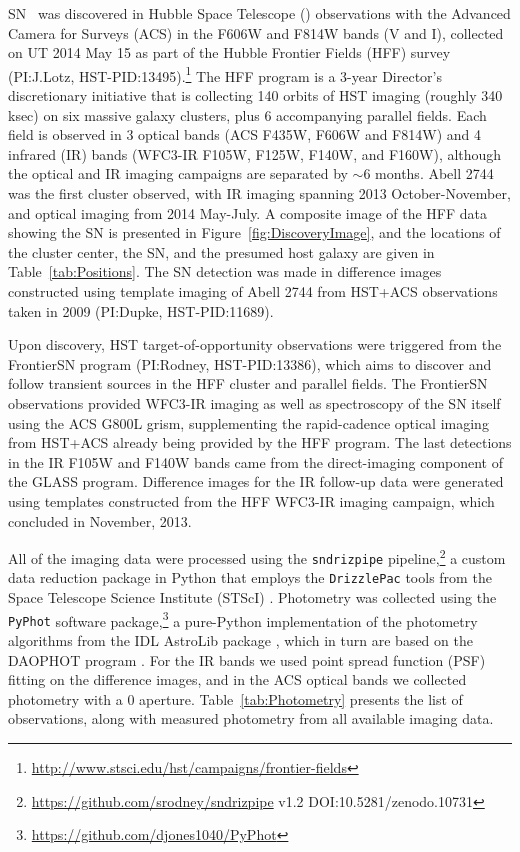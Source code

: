 SN \tomas\ was discovered in Hubble Space Telescope (\HST) observations
with the Advanced Camera for Surveys (ACS) in the F606W and F814W
bands (V and I), collected on UT 2014 May 15 as part of the Hubble
Frontier Fields (HFF) survey (PI:J.Lotz,
HST-PID:13495).\footnote{\url{http://www.stsci.edu/hst/campaigns/frontier-fields}}
The HFF program is a 3-year Director's discretionary initiative that
is collecting 140 orbits of HST imaging (roughly 340 ksec) on six
massive galaxy clusters, plus 6 accompanying parallel fields.  Each
field is observed in 3 optical bands (ACS F435W, F606W and F814W) and
4 infrared (IR) bands (WFC3-IR F105W, F125W, F140W, and F160W),
although the optical and IR imaging campaigns are separated by $\sim$6
months. Abell 2744 was the first cluster observed, with IR imaging
spanning 2013 October-November, and optical imaging from 2014
May-July.  A composite image of the HFF data showing the SN is
presented in Figure~\ref{fig:DiscoveryImage}, and the
locations of the cluster center, the SN, and the presumed host galaxy
are given in Table~\ref{tab:Positions}.  The SN detection was made in
difference images constructed using template imaging of Abell 2744
from HST+ACS observations taken in 2009 (PI:Dupke, HST-PID:11689).





Upon discovery, HST target-of-opportunity observations were triggered
from the FrontierSN program (PI:Rodney, HST-PID:13386), which aims to
discover and follow transient sources in the HFF cluster and parallel
fields. The FrontierSN observations provided WFC3-IR imaging as well
as spectroscopy of the SN itself using the ACS G800L grism,
supplementing the rapid-cadence optical imaging from HST+ACS already
being provided by the HFF program. The last detections in the IR F105W
and F140W bands came from the direct-imaging component of the GLASS
program.  Difference images for the IR follow-up data were generated
using templates constructed from the HFF WFC3-IR imaging campaign,
which concluded in November, 2013.

All of the imaging data were processed using the {\tt sndrizpipe}
pipeline,\footnote{\url{https://github.com/srodney/sndrizpipe} v1.2
DOI:10.5281/zenodo.10731} a custom data reduction package in Python
that employs the {\tt DrizzlePac} tools from the Space Telescope
Science Institute (STScI) \citep{Fruchter:2010}.  Photometry was
collected using the {\tt PyPhot} software
package,\footnote{\url{https://github.com/djones1040/PyPhot}} a
pure-Python implementation of the photometry algorithms from the IDL
AstroLib package \citep{Landsman:1993}, which in turn are based on the
DAOPHOT program \citep{Stetson:1987}.  For the IR bands we used point
spread function (PSF) fitting on the difference images, and in the ACS
optical bands we collected photometry with a
0 aperture. Table~\ref{tab:Photometry} presents the list of
observations, along with measured photometry from all available
imaging data.

